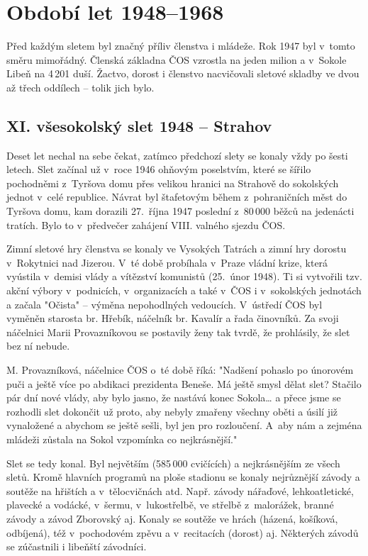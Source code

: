 \documentclass[a5paper, 11pt, twoside]{article}
\begin{document}
\section{Období let 1948--1968}

Před každým sletem byl značný příliv členstva i mládeže. Rok 1947 byl
v~tomto směru mimořádný. Členská základna ČOS vzrostla na jeden milion a
v~Sokole Libeň na 4\,201 duší. Žactvo, dorost i členstvo nacvičovali
sletové skladby ve dvou až třech oddílech -- tolik jich bylo.

\subsection{XI. všesokolský slet 1948 -- Strahov}

Deset let nechal na sebe čekat, zatímco předchozí slety se konaly vždy
po šesti letech. Slet začínal už v~roce 1946 ohňovým poselstvím, které
se šířilo pochodněmi z~Tyršova domu přes velikou hranici na Strahově do
sokolských jednot v~celé republice. Návrat byl štafetovým během
z~pohraničních měst do Tyršova domu, kam dorazili 27.~října 1947 poslední
z~80\,000 běžců na jedenácti tratích. Bylo to v~předvečer zahájení VIII.
valného sjezdu ČOS.

Zimní sletové hry členstva se konaly ve Vysokých Tatrách a zimní hry
dorostu v~Rokytnici nad Jizerou. V~té době probíhala v~Praze vládní
krize, která vyústila v~demisi vlády a vítězství komunistů (25.~únor
1948). Ti si vytvořili tzv. akční výbory v~podnicích, v~organizacích a
také v~ČOS i v~sokolských jednotách a začala "Očista" -- výměna
nepohodlných vedoucích. V~ústředí ČOS byl vyměněn starosta br. Hřebík,
náčelník br. Kavalír a řada činovníků. Za svoji náčelnici Marii
Provazníkovou se postavily ženy tak tvrdě, že prohlásily, že slet bez ní
nebude.

M. Provazníková, náčelnice ČOS o~té době říká: "Nadšení pohaslo po
únorovém puči a ještě více po abdikaci prezidenta Beneše. Má ještě smysl
dělat slet? Stačilo pár dní nové vlády, aby bylo jasno, že nastává konec
Sokola\ldots{} a přece jsme se rozhodli slet dokončit už proto, aby nebyly
zmařeny všechny oběti a úsilí již vynaložené a abychom se ještě sešli,
byl jen pro rozloučení. A~aby nám a zejména mládeži zůstala na Sokol
vzpomínka co nejkrásnější."

Slet se tedy konal. Byl největším (585\,000 cvičících) a nejkrásnějším ze
všech sletů. Kromě hlavních programů na ploše stadionu se konaly
nejrůznější závody a soutěže na hřištích a v~tělocvičnách atd. Např.
závody nářaďové, lehkoatletické, plavecké a vodácké, v~šermu,
v~lukostřelbě, ve střelbě z~malorážek, branné závody a závod Zborovský aj.
Konaly se soutěže ve hrách (házená, košíková, odbíjená), též
v~pochodovém zpěvu a v~recitacích (dorost) aj. Některých závodů se
zúčastnili i libeňští závodníci.
\end{document}
